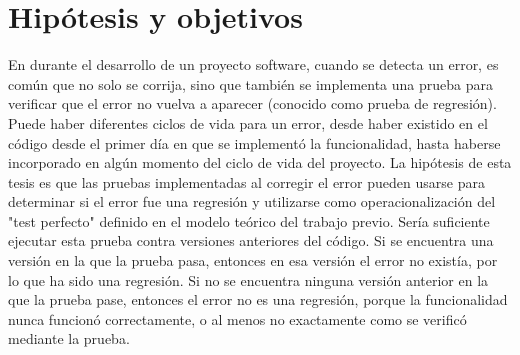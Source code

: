 \section{Hipótesis y objetivos}
\label{sec:resumen:hipotesis}

En durante el desarrollo de un proyecto software, cuando se detecta un error, es común que no solo se corrija, sino que también se implementa una prueba para verificar que el error no vuelva a aparecer (conocido como prueba de regresión). 
Puede haber diferentes ciclos de vida para un error, desde haber existido en el código desde el primer día en que se implementó la funcionalidad, hasta haberse incorporado en algún momento del ciclo de vida del proyecto.
La hipótesis de esta tesis es que las pruebas implementadas al corregir el error pueden usarse para determinar si el error fue una regresión y utilizarse como operacionalización del "test perfecto" definido en el modelo teórico del trabajo previo. 
Sería suficiente ejecutar esta prueba contra versiones anteriores del código. 
Si se encuentra una versión en la que la prueba pasa, entonces en esa versión el error no existía, por lo que ha sido una regresión. 
Si no se encuentra ninguna versión anterior en la que la prueba pase, entonces el error no es una regresión, porque la funcionalidad nunca funcionó correctamente, o al menos no exactamente como se verificó mediante la prueba.

